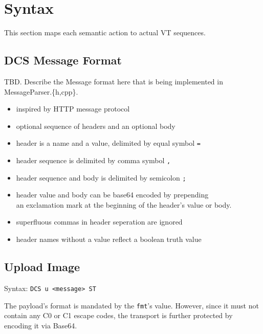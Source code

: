 \documentclass[a4paper]{article}
\newcommand{\code}[1]{\colorbox{light-gray}{\texttt{#1}}}
\begin{document}

\section{Syntax} %

This section maps each semantic action to actual VT sequences.

\subsection{DCS Message Format} %


TBD. Describe the Message format here that is being implemented in MessageParser.\{h,cpp\}.

\begin{itemize}
    \item inspired by HTTP message protocol
    \item optional sequence of headers and an optional body
    \item header is a name and a value, delimited by equal symbol \code{=}
    \item header sequence is delimited by comma symbol \code{,}
    \item header sequence and body is delimited by semicolon \code{;}
    \item header value and body can be base64 encoded by prepending \\
        an exclamation mark at the beginning of the header's value or body.
    \item superfluous commas in header seperation are ignored
    \item header names without a value reflect a boolean truth value
\end{itemize}


\subsection{Upload Image} %

Syntax: \code{DCS u <message> ST}

The payload's format is mandated by the \code{fmt}'s value. However, since it must not contain
any C0 or C1 escape codes, the transport is further protected by encoding it via Base64.
\end{document}
